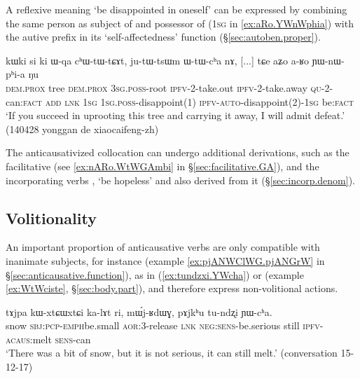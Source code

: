 A reflexive meaning `be disappointed in oneself'  can be expressed by combining the same person as subject of  and possessor of   (\textsc{1sg} in  \ref{ex:aRo.YWnWphia}) with the autive prefix  in its `self-affectedness' function (§\ref{sec:autoben.proper}).

 \begin{exe}
\ex \label{ex:aRo.YWnWphia}
\gll kɯki si ki ɯ-qa cʰɯ-tɯ-tɕɤt, ju-tɯ-tsɯm ɯ-tɯ-cʰa nɤ,  [...] tɕe aʑo a-ʁo ɲɯ-nɯ-pʰi-a ŋu  \\
\textsc{dem}.\textsc{prox} tree \textsc{dem}.\textsc{prox} \textsc{3sg}.\textsc{poss}-root \textsc{ipfv}-2-take.out \textsc{ipfv}-2-take.away \textsc{qu}-2-can:\textsc{fact} \textsc{add} {  } \textsc{lnk} \textsc{1sg} \textsc{1sg}.\textsc{poss}-disappoint(1) \textsc{ipfv}-\textsc{auto}-disappoint(2)-\textsc{1sg} be:\textsc{fact} \\
\glt `If you succeed in uprooting this tree and carrying it away, I will admit defeat.' (140428 yonggan de xiaocaifeng-zh)
\end{exe}

The anticausativized collocation  can undergo additional derivations, such as the facilitative (see \ref{ex:nARo.WtWGAmbi} in §\ref{sec:facilitative.GA}), and the incorporating verbs , `be hopeless' and  also derived from it (§\ref{sec:incorp.denom}).

\subsection{Volitionality} \label{sec:anticausative.volitionality} 
An important proportion of anticausative verbs are only compatible with inanimate subjects, for instance  (example \ref{ex:pjANWClWG.pjANGrW} in §\ref{sec:anticausative.function}),  as in (\ref{ex:tundzxi.YWcha}) or  (example \ref{ex:WtWciste}, §\ref{sec:body.part}), and therefore express non-volitional actions.

\begin{exe}
\ex \label{ex:tundzxi.YWcha}
\gll tɤjpa kɯ-xtɕɯ\redp{}xtɕi ka-lɤt ri, mɯ́j-ʁdɯɣ, pɤjkʰu tu-ndʐi ɲɯ-cʰa. \\
snow \textsc{sbj}:\textsc{pcp}-\textsc{emph}\redp{}be.small \textsc{aor}:3\flobv{}-release \textsc{lnk} \textsc{neg}:\textsc{sens}-be.serious still \textsc{ipfv}-\textsc{acaus}:melt \textsc{sens}-can \\
\glt `There was a bit of snow, but it is not serious, it can still melt.' (conversation 15-12-17)
\end{exe} 

